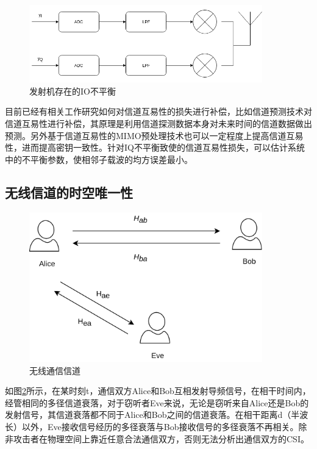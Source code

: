 \documentclass[master]{seuthesis} %
\begin{document}
\begin{Main}
\begin{figure}[htbp!]
    \centering \includegraphics[width=0.9\textwidth]{images/iq_imbalance} 
    \caption{发射机存在的IO不平衡}
    \label{iq_imbalance}
\end{figure}


目前已经有相关工作研究如何对信道互易性的损失进行补偿，比如信道预测技术对信道互易性进行补偿，其原理是利用信道探测数据本身对未来时间的信道数据做出预测\cite{heidari2010adaptive}。另外基于信道互易性的MIMO预处理技术也可以一定程度上提高信道互易性，进而提高密钥一致性。针对IQ不平衡致使的信道互易性损失，可以估计系统中的不平衡参数，使相邻子载波的均方误差最小\cite{tubbax2005compensation}。

\subsection{无线信道的时空唯一性}

\begin{figure}[htbp!]
    \centering \includegraphics[width=0.9\textwidth]{images/channel} 
    \caption{无线通信信道}
    \label{wireless-channel}
\end{figure}

如图\ref{wireless-channel}所示，在某时刻t，通信双方Alice和Bob互相发射导频信号，在相干时间内，经管相同的多径信道衰落，对于窃听者Eve来说，无论是窃听来自Alice还是Bob的发射信号，其信道衰落都不同于Alice和Bob之间的信道衰落。在相干距离d（半波长）以外，Eve接收信号经历的多径衰落与Bob接收信号的多径衰落不再相关。除非攻击者在物理空间上靠近任意合法通信双方，否则无法分析出通信双方的CSI\cite{sasaoka2009secret}。


\end{Main}
\end{document}
